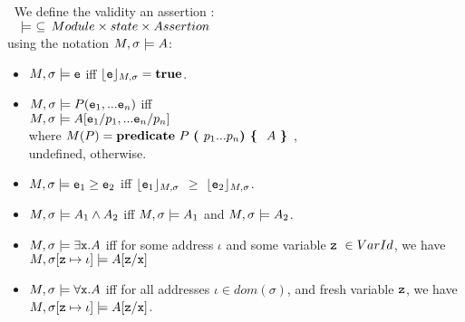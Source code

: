 \begin{definition} $ ~ $  
\label{def:one-state-assertion:valid}
We define the  validity an  assertion \syntax{\A}:
$ ~ $
\\
 
\noindent
$
\  \ \ \models\ \subseteq \,  {Module} \times   {state}   \times  Assertion
$
\\

\noindent
using the notation  $M,\sigma \models A$: \\

 
\begin{itemize}
 \item
 $M,\sigma  \models {{{\ensuremath{\textrm{\ttfamily{e}}}}}}$ iff ${\lfloor{ { {{{\ensuremath{\textrm{\ttfamily{e}}}}}}}}\rfloor_{M,\sigma}}={\bf {true}}$.
  \item
 $M,\sigma   \models {{P}({{{\ensuremath{\textrm{\ttfamily{e}}}}}_1},...{{{\ensuremath{\textrm{\ttfamily{e}}}}}_n})}$ iff \\
   $M,\sigma  \models {{A}[{{{\ensuremath{\textrm{\ttfamily{e}}}}}_1}/{p_1}, ... {{{\ensuremath{\textrm{\ttfamily{e}}}}}_n}/{p_n}]}$
 \\
 where  $ M(P) =  {\bf {predicate}} ~{P}~\mbox{\tt{\bf{( }}} {p_1}...{p_n} \mbox{\tt{\bf{) }}}\mbox{\tt{\bf{\{ }}}~   {A}~ \mbox{\tt{\bf{\} }}} $,
 \\
 undefined, otherwise.
 
  \item  $M,\sigma  \models {{{\ensuremath{\textrm{\ttfamily{e}}}}}_1}\geq{{{\ensuremath{\textrm{\ttfamily{e}}}}}_2}$ iff ${\lfloor{ { {{{\ensuremath{\textrm{\ttfamily{e}}}}}_1}}}\rfloor_{M,\sigma}}$
  $\geq$ ${\lfloor{ { {{{\ensuremath{\textrm{\ttfamily{e}}}}}_2}}}\rfloor_{M,\sigma}}$.
  
    \item
 $M,\sigma  \models {\ensuremath {A}_1}\wedge{\ensuremath {A}_2}$ iff  $M,\sigma  \models {\ensuremath {A}_1}$ and  $M,\sigma  \models {\ensuremath {A}_2}$.
  
  
 \item
  $M,\sigma  \models \exists {\ensuremath{\textrm{\ttfamily{x}}}}.{A}$ iff for some address $\iota$ and some  variable ${\textrm{\ttfamily{z}}}\ \in {VarId}$,  we have $M,\sigma[{\textrm{\ttfamily{z}}}\mapsto\iota] \models  {\ensuremath {A}[{\ensuremath{\textrm{\ttfamily{z}}}}/{\ensuremath{\textrm{\ttfamily{x}}}}}]$
  
  \item
  $M,\sigma  \models \forall {\ensuremath{\textrm{\ttfamily{x}}}}.{A}$ iff for all addresses $\iota\!\in dom\!(\sigma)$, and fresh variable ${\textrm{\ttfamily{z}}}$, we have  $M,\sigma[{\textrm{\ttfamily{z}}}\mapsto\iota] \models  {\ensuremath {A}[{\ensuremath{\textrm{\ttfamily{z}}}}/{\ensuremath{\textrm{\ttfamily{x}}}}}]$.  
  

\end{itemize}
\end{definition}
